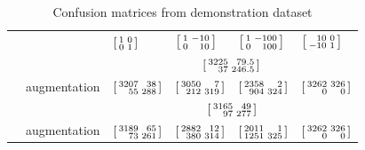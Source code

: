 \documentclass[\ifafour a4paper,12pt,\else a5paper,10pt,\fi%
onecolumn,oneside,article,%
british%
]{memoir}
\theoremstyle{remark}
\theoremstyle{innote}
\renewcommand*{\|}[1][]{\nonscript\:#1\vert\nonscript\:\mathopen{}}
\newcommand*{\sumatrix}[4]{\begin{bsmallmatrix*}[r]#1&#2\\#3&#4\end{bsmallmatrix*}}
\begin{document}
%
\begin{table}[!p]
  \centering
  \small
  \begin{tabular*}{\linewidth}{clw{c}{0.12\linewidth}w{c}{0.12\linewidth}w{c}{0.12\linewidth}w{c}{0.12\linewidth}}
&    &$\sumatrix{1}{0}{0}{1}$
 &$\sumatrix{1}{-10}{0}{10}$
 &$\sumatrix{1}{-100}{0}{100}$
 &$\sumatrix{10}{0}{-10}{1}$
    \\[4\jot]
 &\parbox{0.21\linewidth}{\color{myred}}
 &\multicolumn{4}{c}{\textcolor{myred}{$\sumatrix{3225}{79.5}{37}{246.5}$}}
 \\[2\jot]
 &\parbox{0.21\linewidth}{\color{mypurpleblue}augmentation}
 &\textcolor{mypurpleblue}{$\sumatrix{3207}{38}{55}{288}$}
 &\textcolor{mypurpleblue}{$\sumatrix{3050}{7}{212}{319}$}
 &\textcolor{mypurpleblue}{$\sumatrix{2358}{2}{904}{324}$}
 &\textcolor{mypurpleblue}{$\sumatrix{3262}{326}{0}{0}$}
 \\[6\jot]
 &\parbox{0.21\linewidth}{\color{myred}}
 &\multicolumn{4}{c}{\textcolor{myred}{$\sumatrix{3165}{49}{97}{277}$}}
 \\[2\jot]
 &\parbox{0.21\linewidth}{\color{mypurpleblue} augmentation}
 &\textcolor{mypurpleblue}{$\sumatrix{3189}{65}{73}{261}$}
 &\textcolor{mypurpleblue}{$\sumatrix{2882}{12}{380}{314}$}
 &\textcolor{mypurpleblue}{$\sumatrix{2011}{1}{1251}{325}$}
 &\textcolor{mypurpleblue}{$\sumatrix{3262}{326}{0}{0}$}
 \end{tabular*}
  \\[1em]
  \caption{Confusion matrices from demonstration dataset}
  \label{tab:results_CM}

\vspace{6em}
  

\end{table}
\end{document}
